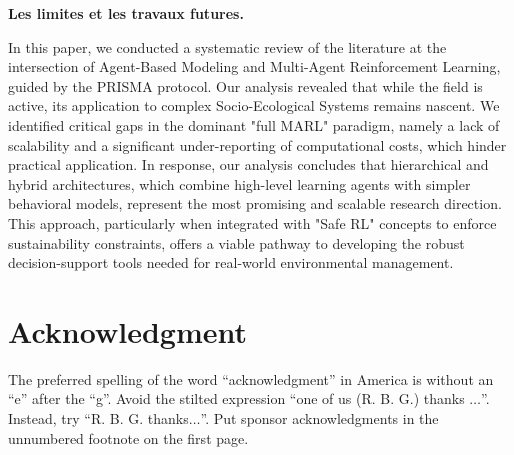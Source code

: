 \documentclass[conference]{IEEEtran}
\begin{document}
\textbf{Les limites et les travaux futures.}

In this paper, we conducted a systematic review of the literature at the intersection of Agent-Based Modeling and Multi-Agent Reinforcement Learning, guided by the PRISMA protocol. Our analysis revealed that while the field is active, its application to complex Socio-Ecological Systems remains nascent. We identified critical gaps in the dominant "full MARL" paradigm, namely a lack of scalability and a significant under-reporting of computational costs, which hinder practical application. In response, our analysis concludes that hierarchical and hybrid architectures, which combine high-level learning agents with simpler behavioral models, represent the most promising and scalable research direction. This approach, particularly when integrated with "Safe RL" concepts to enforce sustainability constraints, offers a viable pathway to developing the robust decision-support tools needed for real-world environmental management.

\section*{Acknowledgment}

The preferred spelling of the word ``acknowledgment'' in America is without 
an ``e'' after the ``g''. Avoid the stilted expression ``one of us (R. B. 
G.) thanks $\ldots$''. Instead, try ``R. B. G. thanks$\ldots$''. Put sponsor 
acknowledgments in the unnumbered footnote on the first page.





\end{document}
